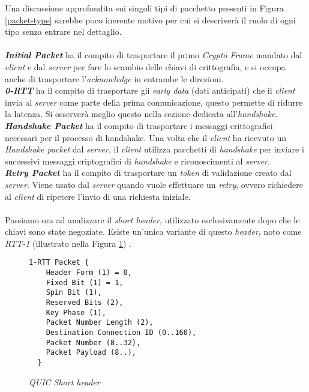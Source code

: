 \noindent Una discussione approfondita sui singoli tipi di pacchetto presenti in Figura \ref{packet-type} sarebbe poco inerente motivo per cui si descriverà il ruolo di ogni tipo senza entrare nel dettaglio. 
\\\\
\indent \textbf{\emph{Initial Packet}} ha il compito di trasportare il primo \emph{Crypto Frame} mandato dal \emph{client} e dal \emph{server} per fare lo scambio delle chiavi di crittografia, e si occupa anche di trasportare l'\emph{acknowledge} in entrambe le direzioni.
\\
\indent \textbf{\emph{0-RTT}}  ha il compito di trasportare gli \emph{early data} (dati anticipati) che il \emph{client} invia al \emph{server} come parte della prima comunicazione, questo permette di ridurre la latenza. Si osserverà meglio questo nella sezione dedicata all'\emph{handshake}.
\\
\indent \textbf{\emph{Handshake Packet}}  ha il compito di trasportare i messaggi crittografici necessari per il processo di handshake. Una volta che il \emph{client} ha ricevuto un \emph{Handshake packet} dal \emph{server}, il \emph{client} utilizza pacchetti di \emph{handshake} per inviare i successivi messaggi criptografici di \emph{handshake} e riconoscimenti al \emph{server}.
\\
\indent \textbf{\emph{Retry Packet}}  ha il compito di trasportare un \emph{token} di validazione creato dal \emph{server}. Viene usato dal \emph{server} quando vuole effettuare un \emph{retry}, ovvero richiedere al \emph{client} di ripetere l'invio di una richiesta iniziale.
\\\\
Passiamo ora ad analizzare il \emph{short header}, utilizzato esclusivamente dopo che le chiavi sono state negoziate. Esiste un'unica variante di questo \emph{header}, noto come \emph{RTT-1} (illustrato nella Figura \ref{short-header}) \cite{site:rfc9000}.
\begin{figure}[!h]
    \centering
    \begin{small}
    \begin{BVerbatim}
1-RTT Packet {
    Header Form (1) = 0,
    Fixed Bit (1) = 1,
    Spin Bit (1),
    Reserved Bits (2),
    Key Phase (1),
    Packet Number Length (2),
    Destination Connection ID (0..160),
    Packet Number (8..32),
    Packet Payload (8..),
  }
    \end{BVerbatim}
\end{small}
    \caption{\emph{QUIC Short header}}
    \label{short-header}
\end{figure}
